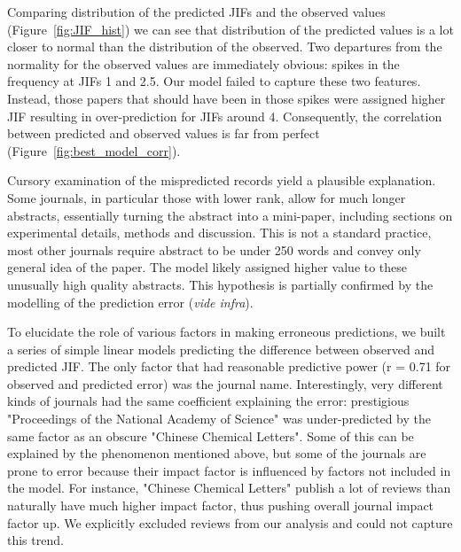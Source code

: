 \documentclass[11pt]{article}
\begin{document}
Comparing distribution of the predicted JIFs and the observed values (Figure~\ref{fig:JIF_hist}) we can see that distribution of the predicted values is a lot closer to normal than the distribution of the observed. Two departures from the normality for the observed values are immediately obvious: spikes in the frequency at JIFs 1 and 2.5. Our model failed to capture these two features. Instead, those papers that should have been in those spikes were assigned higher JIF resulting in over-prediction for JIFs around 4.  Consequently, the correlation between predicted and observed values is far from perfect (Figure~\ref{fig:best_model_corr}). 

Cursory examination of the mispredicted records yield a plausible explanation. Some journals, in particular those with lower rank, allow for much longer abstracts, essentially turning the abstract into a mini-paper, including sections on experimental details, methods and discussion. This is not a standard practice, most other journals require abstract to be under 250 words and convey only general idea of the paper. The model likely assigned higher value to these unusually high quality abstracts. This hypothesis is partially confirmed by the modelling of the prediction error (\textit{vide infra}).

To elucidate the role of various factors in making erroneous predictions, we built a series of simple linear models predicting the difference between observed and predicted JIF. The only factor that had reasonable predictive power (r = 0.71 for observed and predicted error) was the journal name. Interestingly, very different kinds of journals had the same coefficient explaining the error: prestigious "Proceedings of the National Academy of Science" was under-predicted by the same factor as an obscure "Chinese Chemical Letters". Some of this can be explained by the phenomenon mentioned above, but some of the journals are prone to error because their impact factor is influenced by factors not included in the model. For instance, "Chinese Chemical Letters" publish a lot of reviews than naturally have much higher impact factor, thus pushing overall journal impact factor up. We explicitly excluded reviews from our analysis and could not capture this trend.
\end{document}
